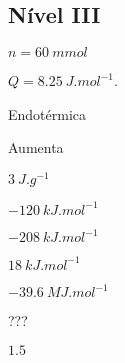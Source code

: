 \documentclass[braun, twocolumn]{braun}
\begin{document}
\subsection{Nível III}


\begin{answers}

\item 

\begin{answers}

\item $n = \qty{60}{mmol}$

\item $Q = \qty{8,25}{J.mol^{-1}}$.

\end{answers}

\item 

\begin{answers}

\item Endotérmica

\item Aumenta

\item $\qty{3}{J.g^{-1}}$

\end{answers}

\item 

\begin{answers}

\item $\qty{-120}{kJ.mol^{-1}}$

\item $\qty{-208}{kJ.mol^{-1}}$

\item $\qty{18}{kJ.mol^{-1}}$

\end{answers}

\item 

\begin{answers}

\item $\qty{-39,6}{MJ.mol^{-1}}$

\item ???

\end{answers}

\item $\num{1,5}$


\end{answers}
\end{document}
